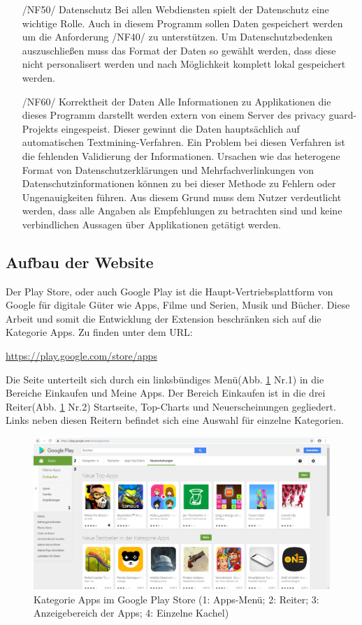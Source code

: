 \begin{itemize}
	\item[/NF50/] Datenschutz
	Bei allen Webdiensten spielt der Datenschutz eine wichtige Rolle. Auch in diesem Programm sollen Daten gespeichert werden um die Anforderung /NF40/ zu unterstützen. Um Datenschutzbedenken auszuschließen muss das Format der Daten so gewählt werden, dass diese nicht personalisert werden und nach Möglichkeit komplett lokal gespeichert werden.
	\item[/NF60/] Korrektheit der Daten
	Alle Informationen zu Applikationen die dieses Programm darstellt werden extern von einem Server des privacy guard-Projekts eingespeist. Dieser gewinnt die Daten hauptsächlich auf automatischen Textmining-Verfahren. Ein Problem bei diesen Verfahren ist die fehlenden Validierung der Informationen. Ursachen wie das heterogene Format von Datenschutzerklärungen und Mehrfachverlinkungen von Datenschutzinformationen können zu bei dieser Methode zu Fehlern oder Ungenauigkeiten führen. Aus diesem Grund muss dem Nutzer verdeutlicht werden, dass alle Angaben als Empfehlungen zu betrachten sind und keine verbindlichen Aussagen über Applikationen getätigt werden.
\end{itemize}
\subsection{Aufbau der Website}

Der Play Store, oder auch \glqq Google Play\grqq{} ist die Haupt-Vertriebsplattform von Google für digitale Güter wie Apps, Filme und Serien, Musik und Bücher. Diese Arbeit und somit die Entwicklung der Extension beschränken sich auf die Kategorie \glqq Apps\grqq{}. Zu finden unter dem URL:

\glqq \url{https://play.google.com/store/apps}\grqq{}

Die Seite unterteilt sich durch ein linksbündiges Menü(Abb. \ref{playstore1} Nr.1) in die Bereiche \glqq Einkaufen\grqq{} und \glqq Meine Apps\grqq{}. Der Bereich \glqq Einkaufen\grqq{} ist in die drei Reiter(Abb. \ref{playstore1} Nr.2) \glqq Startseite\grqq{}, \glqq Top-Charts\grqq{} und \glqq Neuerscheinungen\grqq{} gegliedert. Links neben diesen Reitern befindet sich eine Auswahl für einzelne Kategorien.

\begin{figure}[ht]
	\centering
	\includegraphics[width=1\textwidth]{pics/playstore1num.png}
	\caption{Kategorie Apps im Google Play Store (1: Apps-Menü; 2: Reiter; 3: Anzeigebereich der Apps; 4: Einzelne Kachel)}
	\label{playstore1}
\end{figure}

